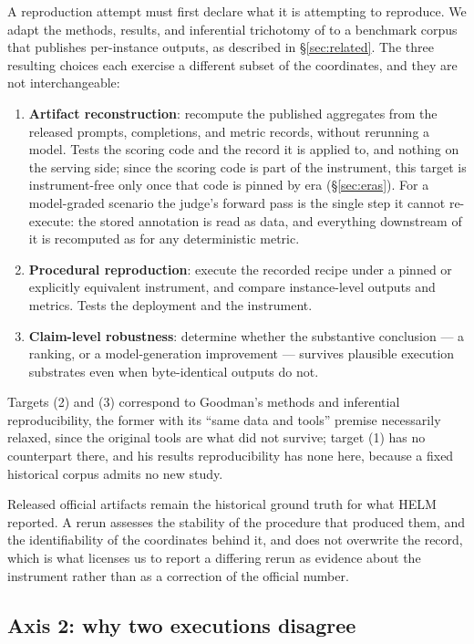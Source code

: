A reproduction attempt must first declare what it is attempting to reproduce. We adapt the methods, results, and inferential trichotomy of \citet{goodman2016does} to a benchmark corpus that publishes per-instance outputs, as described in \S\ref{sec:related}. The three resulting choices each exercise a different subset of the coordinates, and they are not interchangeable:

\begin{enumerate}[nosep,leftmargin=1.6em]
  \item \textbf{Artifact reconstruction}: recompute the published aggregates from the released prompts, completions, and metric records, without rerunning a model. Tests the scoring code and the record it is applied to, and nothing on the serving side; since the scoring code is part of the instrument, this target is instrument-free only once that code is pinned by era (\S\ref{sec:eras}). For a model-graded scenario the judge's forward pass is the single step it cannot re-execute: the stored annotation is read as data, and everything downstream of it is recomputed as for any deterministic metric.
  \item \textbf{Procedural reproduction}: execute the recorded recipe under a pinned or explicitly equivalent instrument, and compare instance-level outputs and metrics. Tests the deployment and the instrument.
  \item \textbf{Claim-level robustness}: determine whether the substantive conclusion --- a ranking, or a model-generation improvement --- survives plausible execution substrates even when byte-identical outputs do not.
\end{enumerate}

Targets (2) and (3) correspond to Goodman's methods and inferential reproducibility, the former with its ``same data and tools'' premise necessarily relaxed, since the original tools are what did not survive; target (1) has no counterpart there, and his results reproducibility has none here, because a fixed historical corpus admits no new study.

Released official artifacts remain the historical ground truth for what HELM reported. A rerun assesses the stability of the procedure that produced them, and the identifiability of the coordinates behind it, and does not overwrite the record, which is what licenses us to report a differing rerun as evidence about the instrument rather than as a correction of the official number.

\subsection{Axis 2: why two executions disagree}
\label{sec:taxonomy}

